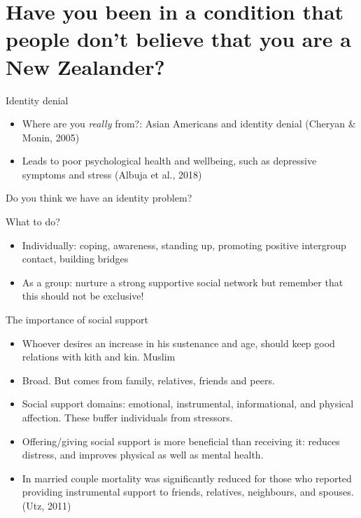 \documentclass[
  ignorenonframetext,
  aspectratio=169,
]{beamer}
\providecommand{\tightlist}{%
  \setlength{\itemsep}{0pt}\setlength{\parskip}{0pt}}\usepackage{longtable,booktabs,array}
\begin{document}
\section{Have you been in a condition that people don't believe that you
are a New
Zealander?}\label{have-you-been-in-a-condition-that-people-dont-believe-that-you-are-a-new-zealander}

\begin{frame}{Identity denial}
\label{identity-denial}
\begin{itemize}
\tightlist
\item
  Where are you \emph{really} from?: Asian Americans and identity denial
  (Cheryan \& Monin, 2005)
\item
  Leads to poor psychological health and wellbeing, such as depressive
  symptoms and stress (Albuja et al., 2018)
\end{itemize}
\end{frame}

\begin{frame}{Do you think we have an identity problem?}
\label{do-you-think-we-have-an-identity-problem}
\end{frame}

\begin{frame}{What to do?}
\label{what-to-do}
\begin{itemize}[<+->]
\tightlist
\item
  Individually: coping, awareness, standing up, promoting positive
  intergroup contact, building bridges
\item
  As a group: nurture a strong supportive social network but remember
  that this should not be exclusive!
\end{itemize}
\end{frame}

\begin{frame}{The importance of social support}
\label{the-importance-of-social-support}
\begin{itemize}[<+->]
\tightlist
\item
  Whoever desires an increase in his sustenance and age, should keep
  good relations with kith and kin. Muslim
\item
  Broad. But comes from family, relatives, friends and peers.
\item
  Social support domains: emotional, instrumental, informational, and
  physical affection. These buffer individuals from stressors.
\item
  Offering/giving social support is more beneficial than receiving it:
  reduces distress, and improves physical as well as mental health.
\item
  In married couple mortality was significantly reduced for those who
  reported providing instrumental support to friends, relatives,
  neighbours, and spouses. (Utz, 2011)
\end{itemize}
\end{frame}
\end{document}
